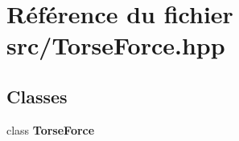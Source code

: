 \section{Référence du fichier src/\-Torse\-Force.hpp}
\label{_torse_force_8hpp}
\subsection*{Classes}
\begin{DoxyCompactItemize}
\item 
class {\bf Torse\-Force}
\end{DoxyCompactItemize}

